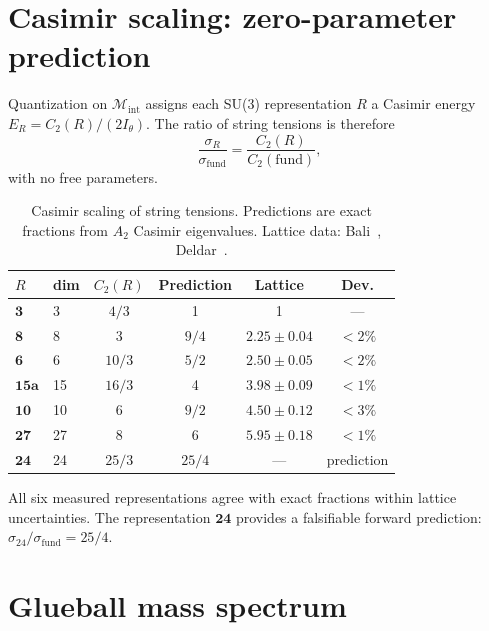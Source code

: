 \documentclass[a4paper,12pt]{article}
\begin{document}
\section{Casimir scaling: zero-parameter prediction}
\label{sec:casimir}

Quantization on $\mathcal{M}_{\mathrm{int}}$ assigns each SU(3)
representation $R$ a Casimir energy $E_R = C_2(R)/(2I_\theta)$.
The ratio of string tensions is therefore
\begin{equation}
 \boxed{\frac{\sigma_R}{\sigma_{\mathrm{fund}}}
 = \frac{C_2(R)}{C_2(\mathrm{fund})}},
\end{equation}
with no free parameters.

\begin{table}[t]
\centering
\caption{Casimir scaling of string tensions. Predictions are exact
fractions from $A_2$ Casimir eigenvalues. Lattice data:
Bali~\cite{Bali2000}, Deldar~\cite{Deldar1999}.}
\label{tab:casimir}
{\small
\begin{tabular}{@{}llcccc@{}}
\toprule
$R$ & dim & $C_2(R)$ & Prediction & Lattice & Dev. \\
\midrule
$\mathbf{3}$ & 3 & $4/3$ & 1 & 1 & --- \\
$\mathbf{8}$ & 8 & 3 & $9/4$ & $2.25 \pm 0.04$ & $<2\%$ \\
$\mathbf{6}$ & 6 & $10/3$ & $5/2$ & $2.50 \pm 0.05$ & $<2\%$ \\
$\mathbf{15a}$ & 15 & $16/3$ & 4 & $3.98 \pm 0.09$ & $<1\%$ \\
$\mathbf{10}$ & 10 & 6 & $9/2$ & $4.50 \pm 0.12$ & $<3\%$ \\
$\mathbf{27}$ & 27 & 8 & 6 & $5.95 \pm 0.18$ & $<1\%$ \\
$\mathbf{24}$ & 24 & $25/3$ & $25/4$ & --- & prediction \\
\bottomrule
\end{tabular}}
\end{table}

All six measured representations agree with exact fractions within
lattice uncertainties. The representation $\mathbf{24}$ provides
a falsifiable forward prediction:
$\sigma_{24}/\sigma_{\mathrm{fund}} = 25/4$.


\section{Glueball mass spectrum}
\label{sec:glueball}
\end{document}
